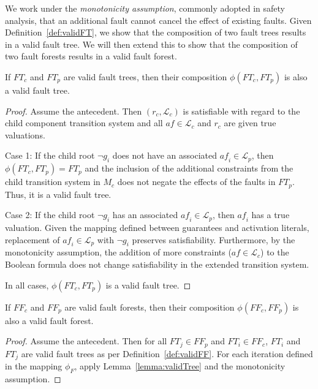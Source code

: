 We work under the {\em monotonicity assumption}, commonly adopted in safety analysis, that an additional fault cannot cancel the effect of existing faults. Given Definition~\ref{def:validFT}, we show that the composition of two fault trees results in a valid fault tree. We will then extend this to show that the composition of two fault forests results in a valid fault forest.

\begin{lemma} If $\mathit{FT}_c$ and $\mathit{FT}_p$ are valid fault trees, then their composition $\phi(\mathit{FT}_c, \mathit{FT}_p)$ is also a valid fault tree. 
\begin{proof}
Assume the antecedent. Then $(r_c, \mathcal{L}_c)$ is satisfiable with regard to the child component transition system and all $\mathit{af} \in \mathcal{L}_c$ and $r_c$ are given true valuations. 

Case 1: If the child root $\neg g_i$ does not have an associated $\mathit{af_i} \in \mathcal{L}_p$, then $\phi(\mathit{FT}_c, \mathit{FT}_p) = \mathit{FT}_p$ and the inclusion of the additional constraints from the child transition system in $M_c$ does not negate the effects of the faults in $FT_p$. Thus, it is a valid fault tree. 

Case 2: If the child root $\neg g_i$ has an associated $\mathit{af_i} \in \mathcal{L}_p$, then $\mathit{af_i}$ has a true valuation. Given the mapping defined between guarantees and activation literals, replacement of $\mathit{af_i} \in \mathcal{L}_p$ with $\neg g_i$ preserves satisfiability. Furthermore, by the monotonicity assumption, the addition of more constraints ($\mathit{af} \in \mathcal{L}_c$) to the Boolean formula does not change satisfiability in the extended transition system.

In all cases, $\phi(\mathit{FT}_c, \mathit{FT}_p)$ is a valid fault tree. 
\end{proof}
\label{lemma:validTree}
\end{lemma}


\begin{lemma} If $\mathit{FF_c}$ and $\mathit{FF_p}$ are valid fault forests, then their composition $\phi(\mathit{FF_c}, \mathit{FF_p})$ is also a valid fault forest. 
\begin{proof}

Assume the antecedent. Then for all $\mathit{FT_j} \in \mathit{FF_p}$ and $\mathit{FT_i} \in \mathit{FF_c}$, $\mathit{FT_i}$ and $\mathit{FT_j}$ are valid fault trees as per Definition~\ref{def:validFF}. For each iteration defined in the mapping $\phi_F$, apply Lemma~\ref{lemma:validTree} and the monotonicity assumption. 

\end{proof}
\label{lemma:validForest}
\end{lemma}



